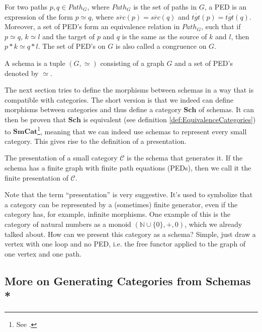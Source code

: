\begin{definition}
  For two paths $p,q \in Path_G$, where $Path_G$ is the set of paths in $G$, a PED is an expression of the form
  $p \simeq q$, where $\overline{src}(p) = \overline{src}(q)$ and $\overline {tgt}(p)=\overline {tgt}(q)$.
  Moreover, a set of PED's form an equivalence relation in $Path_G$, such that
  if $p \simeq q$, $k \simeq l$ and the target of $p$ and $q$ is the same as the source
  of $k$ and $l$, then $p * k \simeq q * l$.
  The set of PED's on $G$ is also called a congruence on $G$.
\end{definition}

\begin{definition}
  A schema is a tuple $(G, \simeq)$ consisting of a graph $G$ and a set of PED's denoted by $\simeq$.
\end{definition}

The next section tries to define the morphisms between
schemas in a way that is compatible with categories. The short version is that we indeed
can define morphisms between categories and thus define a category $\mathbf{Sch}$ of schemas.
It can then be proven that $\mathbf{Sch}$ is equivalent (see definition \ref{def:EquivalenceCategories}) to 
$\mathbf{SmCat}$\footnote{See \citet{spivak2014category}.}, meaning that we can indeed use schemas
to represent every small category. This gives rise to the definition of a presentation.

\begin{definition}
  The presentation of a small category $\mathcal C$ is the schema that generates it.
  If the schema has a finite graph with finite path equations (PEDs), then we call it
  the finite presentation of $\mathcal C$.
\end{definition}

Note that the term ``presentation'' is very suggestive. It's used to symbolize that
a category can be represented by a (sometimes) finite generator, even if the category
has, for example, infinite morphisms. One example of this is the category
of natural numbers as a monoid $(\mathbb N \cup\{0\},+,0)$, which we already talked about.
How can we present this category as a schema? Simple, just draw a vertex with one loop
and no PED, i.e. the free functor applied to the graph of one vertex and one path.


\subsection{More on Generating Categories from Schemas *}

